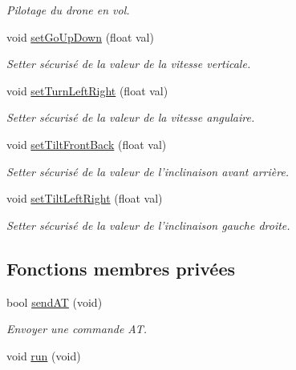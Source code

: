 \begin{DoxyCompactItemize}
\begin{DoxyCompactList}\small\item\em Pilotage du drone en vol. \end{DoxyCompactList}\item 
void \hyperlink{class_a_r_drone_a6d49175397dcce8b90fb2f7200525080}{set\-Go\-Up\-Down} (float val)
\begin{DoxyCompactList}\small\item\em Setter sécurisé de la valeur de la vitesse verticale. \end{DoxyCompactList}\item 
void \hyperlink{class_a_r_drone_a89b56f0ae2e6f9e9103f05fd4c4b8e78}{set\-Turn\-Left\-Right} (float val)
\begin{DoxyCompactList}\small\item\em Setter sécurisé de la valeur de la vitesse angulaire. \end{DoxyCompactList}\item 
void \hyperlink{class_a_r_drone_af59edbd15b6110cd78272fbcef16769d}{set\-Tilt\-Front\-Back} (float val)
\begin{DoxyCompactList}\small\item\em Setter sécurisé de la valeur de l'inclinaison avant arrière. \end{DoxyCompactList}\item 
void \hyperlink{class_a_r_drone_aa9dfdd35fc9ed963c581d3bc1c127d12}{set\-Tilt\-Left\-Right} (float val)
\begin{DoxyCompactList}\small\item\em Setter sécurisé de la valeur de l'inclinaison gauche droite. \end{DoxyCompactList}\end{DoxyCompactItemize}
\subsection*{Fonctions membres privées}
\begin{DoxyCompactItemize}
\item 
bool \hyperlink{class_a_r_drone_a534090497b9f3a959218e2edfe8cda25}{send\-A\-T} (void)
\begin{DoxyCompactList}\small\item\em Envoyer une commande A\-T. \end{DoxyCompactList}\item 
void \hyperlink{class_a_r_drone_ac961be4818d8d0b14d3b4d958590211c}{run} (void)
\end{DoxyCompactItemize}

